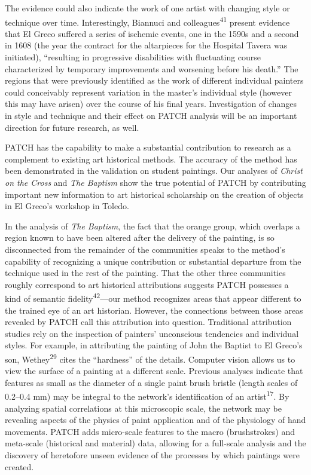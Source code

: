 \documentclass[11pt]{article}
\begin{document}
The evidence could also indicate the work of one artist with changing
style or technique over time. Interestingly, Biannuci and
colleagues\textsuperscript{41} present evidence that El Greco suffered a
series of ischemic events, one in the 1590s and a second in 1608 (the
year the contract for the altarpieces for the Hospital Tavera was
initiated), ``resulting in progressive disabilities with fluctuating
course characterized by temporary improvements and worsening before his
death.'' The regions that were previously identified as the work of
different individual painters could conceivably represent variation in
the master's individual style (however this may have arisen) over the
course of his final years. Investigation of changes in style and
technique and their effect on PATCH analysis will be an important
direction for future research, as well.

PATCH has the capability to make a substantial contribution to research
as a complement to existing art historical methods. The accuracy of the
method has been demonstrated in the validation on student paintings. Our analyses of \emph{Christ on the Cross} and \emph{The Baptism} show the true
potential of PATCH by contributing important new information to art
historical scholarship on the creation of objects in El Greco's workshop
in Toledo.

In the analysis of \emph{The Baptism}, the fact that the orange group,
which overlaps a region known to have been altered after the delivery of
the painting, is so disconnected from the remainder of the communities
speaks to the method's capability of recognizing a unique contribution
or substantial departure from the technique used in the rest of the
painting. That the other three communities roughly correspond to art
historical attributions suggests PATCH possesses a kind of semantic
fidelity\textsuperscript{42}---our method recognizes areas that appear
different to the trained eye of an art historian. However, the
connections between those areas revealed by PATCH call this attribution
into question. Traditional attribution studies rely on the inspection of
painters' unconscious tendencies and individual styles. For example, in
attributing the painting of John the Baptist to El Greco's son,
Wethey\textsuperscript{29} cites the ``hardness'' of the details.
Computer vision allows us to view the surface of a painting at a
different scale. Previous analyses indicate that features as small as
the diameter of a single paint brush bristle (length scales of 0.2--0.4
mm) may be integral to the network's identification of an
artist\textsuperscript{17}. By analyzing spatial correlations at this
microscopic scale, the network may be revealing aspects of the physics
of paint application and of the physiology of hand movements. PATCH adds
micro-scale features to the macro (brushstrokes) and meta-scale
(historical and material) data, allowing for a full-scale analysis and
the discovery of heretofore unseen evidence of the processes by which
paintings were created.
\end{document}
